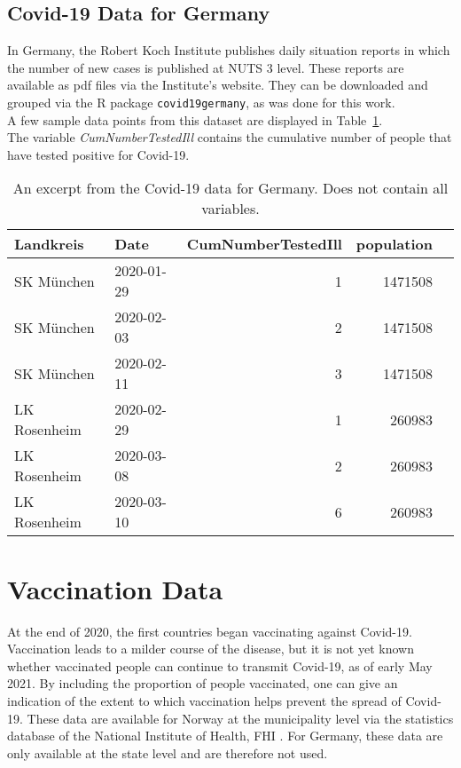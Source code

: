 \subsection{Covid-19 Data for Germany}
In Germany, the Robert Koch Institute publishes daily situation reports in which the number of new cases is published at NUTS 3 level. These reports are available as pdf files via the Institute's website. They can be downloaded and grouped via the R package \texttt{covid19germany}\autocite[][]{covid19germany}, as was done for this work.\\
A few sample data points from this dataset are displayed in Table~\ref{datasetGermany}.\\
The variable \textit{CumNumberTestedIll} contains the cumulative number of people that have tested positive for Covid-19.
\begin{table}[H] 
\caption{An excerpt from the Covid-19 data for Germany. Does not contain all variables.\label{datasetGermany}}
\begin{tabular}{l l r r r}
\toprule
\textbf{Landkreis}	& \textbf{Date}	& \textbf{CumNumberTestedIll} & \textbf{population}\\
\midrule
SK München & 2020-01-29 & 1 & 1471508\\
SK München & 2020-02-03 & 2 & 1471508\\
SK München & 2020-02-11 & 3 & 1471508\\
LK Rosenheim & 2020-02-29 & 1 & 260983\\
LK Rosenheim & 2020-03-08 & 2 & 260983 \\
LK Rosenheim & 2020-03-10 & 6 & 260983 \\
\bottomrule
\end{tabular}
\end{table}
\section{Vaccination Data}
At the end of 2020, the first countries began vaccinating against Covid-19. Vaccination leads to a milder course of the disease, but it is not yet known whether vaccinated people can continue to transmit Covid-19, as of early May 2021. By including the proportion of people vaccinated, one can give an indication of the extent to which vaccination helps prevent the spread of Covid-19. These data are available for Norway at the municipality level via the statistics database of the National Institute of Health, FHI \autocite[][]{fhi}. For Germany, these data are only available at the state level and are therefore not used.
\clearpage
